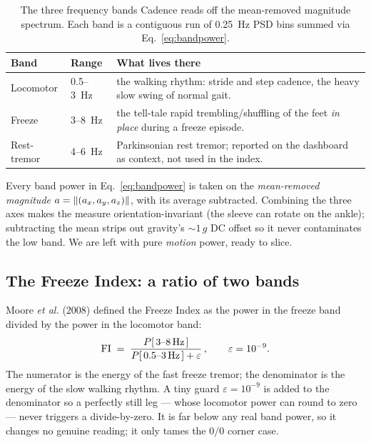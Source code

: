 \begin{table}[H]
\centering
\caption{The three frequency bands Cadence reads off the mean-removed magnitude
spectrum. Each band is a contiguous run of \SI{0.25}{\hertz} PSD bins summed via
Eq.~\eqref{eq:bandpower}.}
\label{tab:bands}
\small
\begin{tabular}{@{}llp{7.6cm}@{}}
\toprule
\textbf{Band} & \textbf{Range} & \textbf{What lives there} \\
\midrule
Locomotor & \SI{0.5}{}--\SI{3}{\hertz} & the walking rhythm: stride and step cadence,
the heavy slow swing of normal gait. \\
Freeze & \SI{3}{}--\SI{8}{\hertz} & the tell-tale rapid trembling/shuffling of the
feet \emph{in place} during a freeze episode. \\
Rest-tremor & \SI{4}{}--\SI{6}{\hertz} & Parkinsonian rest tremor; reported on the
dashboard as context, not used in the index. \\
\bottomrule
\end{tabular}
\end{table}

\begin{keyidea}
Every band power in Eq.~\eqref{eq:bandpower} is taken on the \emph{mean-removed
magnitude} $a=\lVert (a_x,a_y,a_z) \rVert$, with its average subtracted. Combining the three
axes makes the measure orientation-invariant (the sleeve can rotate on the ankle);
subtracting the mean strips out gravity's $\sim\!1\,g$ DC offset so it never
contaminates the low band. We are left with pure \emph{motion} power, ready to slice.
\end{keyidea}

\subsection{The Freeze Index: a ratio of two bands}

Moore \emph{et al.} (2008) defined the Freeze Index as the power in the freeze band
divided by the power in the locomotor band:
%
\begin{equation}
\mathrm{FI} \;=\; \frac{P[\,\SI{3}{}\text{--}\SI{8}{\hertz}\,]}
              {P[\,\SI{0.5}{}\text{--}\SI{3}{\hertz}\,] + \varepsilon}\,,
\qquad \varepsilon = 10^{-9}.
\label{eq:freezeindex}
\end{equation}
%
The numerator is the energy of the fast freeze tremor; the denominator is the energy
of the slow walking rhythm. A tiny guard $\varepsilon = 10^{-9}$ is added to the
denominator so a perfectly still leg --- whose locomotor power can round to zero ---
never triggers a divide-by-zero. It is far below any real band power, so it changes no
genuine reading; it only tames the $0/0$ corner case.

